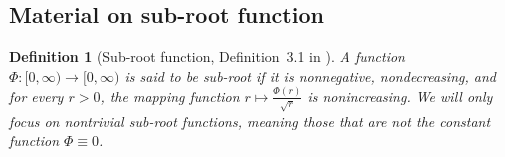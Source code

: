\documentclass{article}
\def\sR{\mathbb{R}}
\def\vx{{\mathbf{x}}}
\def\mX{{\mathbf{X}}}
\newtheorem{definition}{Definition}
\begin{document}



    



    
\subsection{Material on sub-root function}
\label{sec_app:sub_root_func}
\begin{definition}[Sub-root function, Definition~3.1 in \cite{Bartlett_2005}] \label{lemma: sub-root def} 
A function \( \Phi : [0, \infty) \rightarrow [0, \infty) \) is said to be sub-root if it is nonnegative, nondecreasing, and for every \( r > 0 \), the mapping function \( r \mapsto \frac{\Phi(r)}{\sqrt{r}} \) is nonincreasing. We will only focus on nontrivial sub-root functions, meaning those that are not the constant function \( \Phi \equiv 0 \).    
\end{definition}
\end{document}
